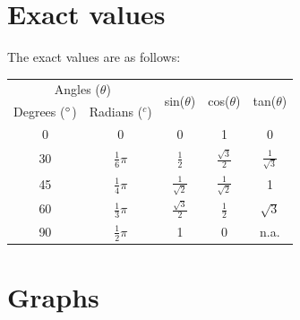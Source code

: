 \documentclass{book}
\begin{document}
\section{Exact values}
The exact values are as follows:

\begin{center}
	\begin{tabular}{c|c|c|c|c}
		\multicolumn{2}{c|}{Angles ($\theta$)}   & \multicolumn{1}{c|}{\multirow{2}{*}{sin($\theta$)}} & \multicolumn{1}{c|}{\multirow{2}{*}{cos($\theta$)}} & \multicolumn{1}{c}{\multirow{2}{*}{tan($\theta$)}}                         \\
		\multicolumn{1}{l|}{Degrees ($\degree$)} & Radians ($^c$)                                      & \multicolumn{1}{c|}{}                               & \multicolumn{1}{c|}{}                              & \multicolumn{1}{c}{}  \\
		\hline
		0                                        & \multicolumn{1}{c|}{0}                              & \multicolumn{1}{c|}{0}                              & \multicolumn{1}{c|}{1}                             & \multicolumn{1}{c}{0} \\
		\hline
		30                                       & $\frac{1}{6}\pi$                                    & $\frac{1}{2}$                                       & $\frac{\sqrt{3}}{2}$                               & $\frac{1}{\sqrt{3}}$  \\
		\hline
		45                                       & $\frac{1}{4}\pi$                                    & $\frac{1}{\sqrt{2}}$                                & $\frac{1}{\sqrt{2}}$                               & \multicolumn{1}{c}{1} \\
		\hline
		60                                       & $\frac{1}{3}\pi$                                    & $\frac{\sqrt{3}}{2}$                                & $\frac{1}{2}$                                      & $\sqrt{3}$            \\
		\hline
		90                                       & $\frac{1}{2}\pi$                                    & \multicolumn{1}{c|}{1}                              & \multicolumn{1}{c|}{0}                             & n.a.
	\end{tabular}
\end{center}



\section{Graphs}
\end{document}
